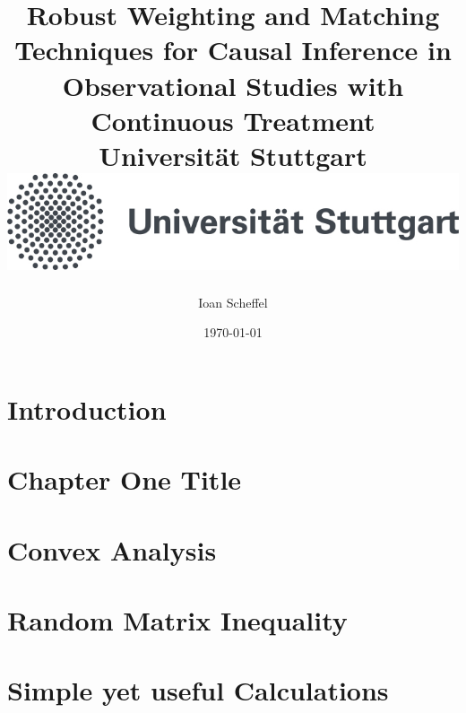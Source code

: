 \documentclass[12pt]{report}
\title{
  {
    Robust Weighting and Matching Techniques for Causal Inference in Observational Studies with Continuous Treatment
  }
  \\
  {\large Universität Stuttgart}
  \\
  {\includegraphics{unistuttgart_logo_deutsch.jpg}}
}
\author{Ioan Scheffel}
\date{\today}
\theoremstyle{definition}
\begin{document}
\maketitle

\tableofcontents 

\chapter{Introduction}


\chapter{Chapter One Title}


\chapter{Convex Analysis}


\chapter{Random Matrix Inequality}


\chapter{Simple yet useful Calculations}




{}

\end{document}
